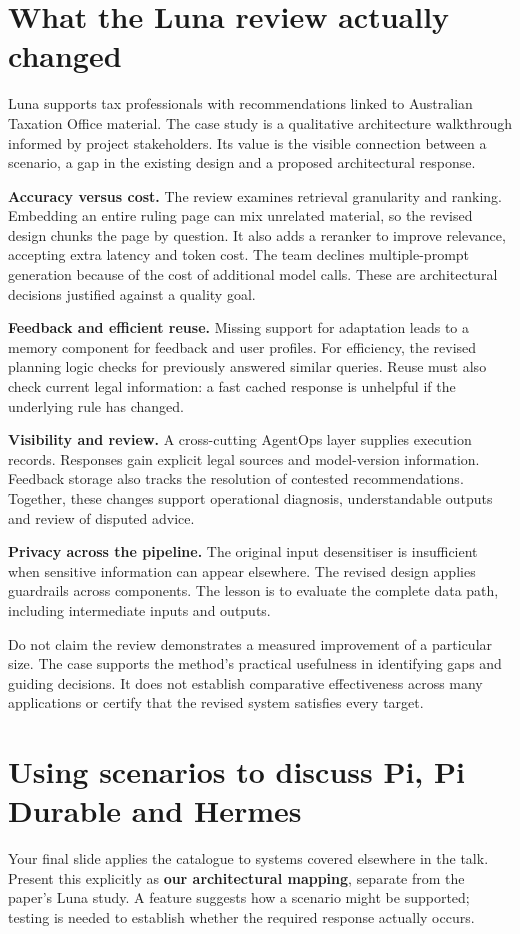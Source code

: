 \documentclass[11pt,a4paper]{article}
\begin{document}
\section{What the Luna review actually changed}
Luna supports tax professionals with recommendations linked to Australian Taxation Office material. The case study is a qualitative architecture walkthrough informed by project stakeholders. Its value is the visible connection between a scenario, a gap in the existing design and a proposed architectural response.

\textbf{Accuracy versus cost.} The review examines retrieval granularity and ranking. Embedding an entire ruling page can mix unrelated material, so the revised design chunks the page by question. It also adds a reranker to improve relevance, accepting extra latency and token cost. The team declines multiple-prompt generation because of the cost of additional model calls. These are architectural decisions justified against a quality goal.

\textbf{Feedback and efficient reuse.} Missing support for adaptation leads to a memory component for feedback and user profiles. For efficiency, the revised planning logic checks for previously answered similar queries. Reuse must also check current legal information: a fast cached response is unhelpful if the underlying rule has changed.

\textbf{Visibility and review.} A cross-cutting AgentOps layer supplies execution records. Responses gain explicit legal sources and model-version information. Feedback storage also tracks the resolution of contested recommendations. Together, these changes support operational diagnosis, understandable outputs and review of disputed advice.

\textbf{Privacy across the pipeline.} The original input desensitiser is insufficient when sensitive information can appear elsewhere. The revised design applies guardrails across components. The lesson is to evaluate the complete data path, including intermediate inputs and outputs.

Do not claim the review demonstrates a measured improvement of a particular size. The case supports the method's practical usefulness in identifying gaps and guiding decisions. It does not establish comparative effectiveness across many applications or certify that the revised system satisfies every target.

\section{Using scenarios to discuss Pi, Pi Durable and Hermes}
Your final slide applies the catalogue to systems covered elsewhere in the talk. Present this explicitly as \textbf{our architectural mapping}, separate from the paper's Luna study. A feature suggests how a scenario might be supported; testing is needed to establish whether the required response actually occurs.
\end{document}
